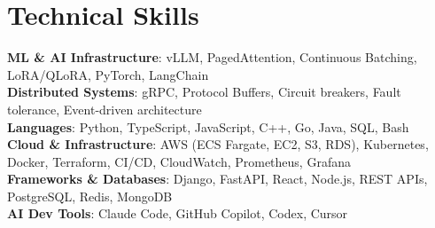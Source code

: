 \documentclass[letterpaper,11pt]{article}
\begin{document}
\section{Technical Skills}
\vspace{-7pt}
\begin{itemize}
[leftmargin=0.15in, label={}]\small{\item{
        \textbf{ML \& AI Infrastructure}{: vLLM, PagedAttention, Continuous Batching, LoRA/QLoRA, PyTorch, LangChain} \\
        \textbf{Distributed Systems}{: gRPC, Protocol Buffers, Circuit breakers, Fault tolerance, Event-driven architecture} \\
        \textbf{Languages}{: Python, TypeScript, JavaScript, C++, Go, Java, SQL, Bash} \\
        \textbf{Cloud \& Infrastructure}{: AWS (ECS Fargate, EC2, S3, RDS), Kubernetes, Docker, Terraform, CI/CD, CloudWatch, Prometheus, Grafana} \\
        \textbf{Frameworks \& Databases}{: Django, FastAPI, React, Node.js, REST APIs, PostgreSQL, Redis, MongoDB} \\
        \textbf{AI Dev Tools}{: Claude Code, GitHub Copilot, Codex, Cursor} \\
}}
\end{itemize}
\end{document}
